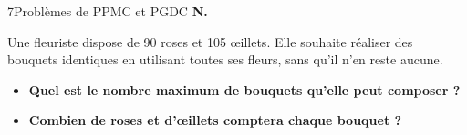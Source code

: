 \begin{exercice}{7}{Problèmes de PPMC et PGDC}
\bigskip\textbf{N.}

\medskip
Une fleuriste dispose de 90 roses et 105 œillets. Elle souhaite réaliser des bouquets identiques en utilisant toutes ses fleurs, sans qu'il n'en reste aucune.

\begin{itemize}[label=$\blacktriangleright$]
\item \textbf{Quel est le nombre maximum de bouquets qu'elle peut composer ?}
\item \textbf{Combien de roses et d'œillets comptera chaque bouquet ?}
\end{itemize}

\end{exercice}
